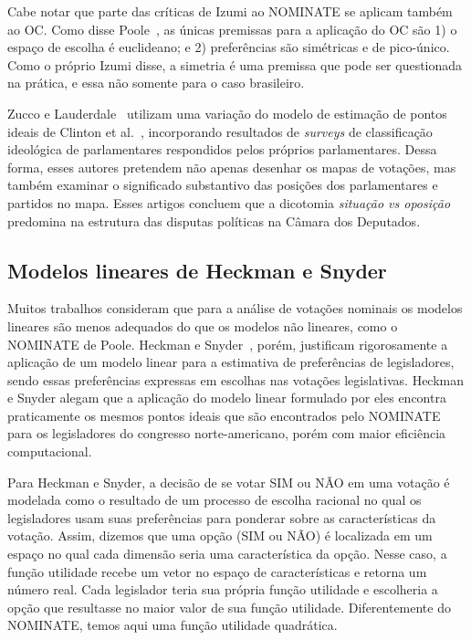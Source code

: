 \documentclass[
	article,			%
	12pt,				%
	oneside,			%
	a4paper,			%
	english,			%
	brazil,				%
	sumario=tradicional,
	oldfontcommands %
	]{abntex2}
\newcommand\nay{NÃO\xspace}
\newcommand\yea{SIM\xspace}
\newcommand\nominate{NOMINATE\xspace}
\begin{document}
Cabe notar que parte das críticas de Izumi ao \nominate se aplicam também ao OC. Como disse Poole~\cite{poole2000oc}, as únicas premissas para a aplicação do OC são 1) o espaço de escolha é euclideano; e 2) preferências são simétricas e de pico-único. Como o próprio Izumi disse, a simetria é uma premissa que pode ser questionada na prática, e essa não somente para o caso brasileiro.

Zucco e Lauderdale~\cite{zucco2011ideologia, zucco2011distinguishing} utilizam uma variação do modelo de estimação de pontos ideais de Clinton et al.~\cite{clinton2004ideal}, incorporando resultados de \emph{surveys} de classificação ideológica de parlamentares respondidos pelos próprios parlamentares. Dessa forma, esses autores pretendem não apenas desenhar os mapas de votações, mas também examinar o significado substantivo das posições dos parlamentares e partidos no mapa. Esses artigos concluem que a dicotomia \emph{situação vs oposição} predomina na estrutura das disputas políticas na Câmara dos Deputados.

\subsection{Modelos lineares de Heckman e Snyder}

Muitos trabalhos consideram que para a análise de votações nominais os modelos lineares são menos adequados do que os modelos não lineares, como o \nominate de Poole. Heckman e Snyder~\cite{heckman-snyder1997}, porém, justificam rigorosamente a aplicação de um modelo linear para a estimativa de preferências de legisladores, sendo essas preferências expressas em escolhas nas votações legislativas. Heckman e Snyder alegam que a aplicação do modelo linear formulado por eles encontra praticamente os mesmos pontos ideais que são encontrados pelo \nominate para os legisladores do congresso norte-americano, porém com maior eficiência computacional.

Para Heckman e Snyder, a decisão de se votar \yea ou \nay em uma votação é modelada como o resultado de um processo de escolha racional no qual os legisladores usam suas preferências para ponderar sobre as características da votação. Assim, dizemos que uma opção (\yea ou \nay) é localizada em um espaço no qual cada dimensão seria uma característica da opção. Nesse caso, a função utilidade recebe um vetor no espaço de características e retorna um número real. Cada legislador teria sua própria função utilidade e escolheria a opção que resultasse no maior valor de sua função utilidade. Diferentemente do NOMINATE, temos aqui uma função utilidade quadrática.
\end{document}
